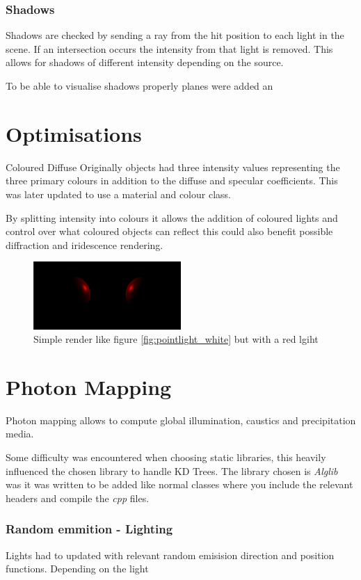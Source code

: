 \documentclass{article}
\begin{document}
\subsubsection{Shadows}
Shadows are checked by sending a ray from the hit position to each light in the scene. If an intersection occurs the intensity from that light is removed. This allows for shadows of different intensity depending on the source.

To be able to visualise shadows properly planes were added an 

\section{Optimisations}
Coloured Diffuse
Originally objects had three intensity values representing the three primary colours in addition to the diffuse and specular coefficients. This was later updated to use a material and colour class.

By splitting intensity into colours it allows the addition of coloured lights and control over what coloured objects can reflect this could also benefit possible diffraction and iridescence rendering.
\begin{figure}[h]
\includegraphics[width=0.5\textwidth]{pointlight_redlight}
\captionsetup{justification=centering,margin=0.5cm}
\caption{Simple render like figure \ref{fig:pointlight_white} but with a red lgiht}
\label{fig:pointlight_red}
\end{figure}

\section{Photon Mapping}
Photon mapping allows to compute global illumination, caustics and precipitation media. 

Some difficulty was encountered when choosing static libraries, this heavily influenced the chosen library to handle KD Trees. The library chosen is \textit{Alglib} was it was written to be added like normal classes where you include the relevant headers and compile the \textit{cpp} files. 
\subsubsection{Random emmition - Lighting}
Lights had to updated with relevant random emisision direction and position functions. Depending on the light 
\end{document}
